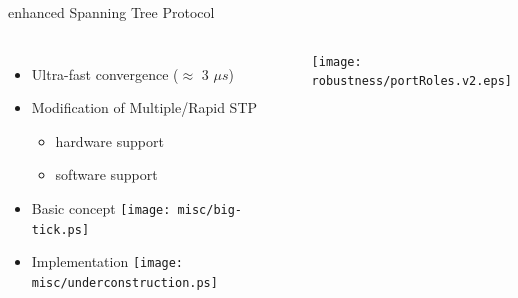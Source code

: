 \documentclass[compress,red]{beamer}
\begin{document}
\begin{frame}{enhanced Spanning Tree Protocol}

\begin{columns}[c]

  \begin{itemize}
    \item Ultra-fast convergence ($\approx$ 3 $\mu s$)
    \item Modification of Multiple/Rapid STP 
    \begin{itemize}
      \item hardware support
      \item software support
     \end{itemize}
    \item Basic concept  \texttt{[image: misc/big-tick.ps]}
    \item Implementation \texttt{[image: misc/underconstruction.ps]}
  \end{itemize}


      \begin{center}
	\texttt{[image: robustness/portRoles.v2.eps]}
      \end{center}

 \end{columns}

\end{frame}
\end{document}
